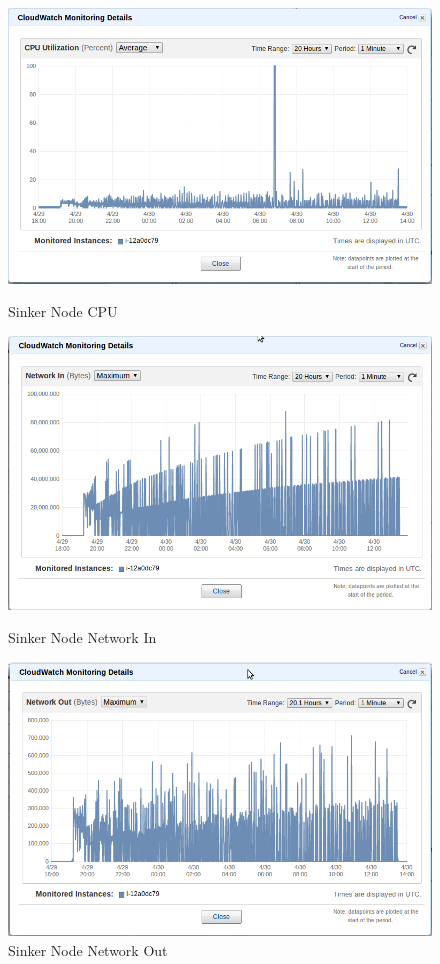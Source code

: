 \begin{figure}
  \includegraphics[width=\linewidth]{pics/sinker_cpu.png}
  \caption{Sinker Node CPU}\label{fig:sinker_cpu}
\endminipage\hfill
{}
  \includegraphics[width=\linewidth]{pics/sinker_network_in.png}
  \caption{Sinker Node Network In}\label{fig:sinker_in}
\endminipage\hfill
{}
  \includegraphics[width=\linewidth]{pics/sinker_network_out.png}
  \caption{Sinker Node Network Out}\label{fig:sinker_out}
\endminipage\hfill
\end{figure}
